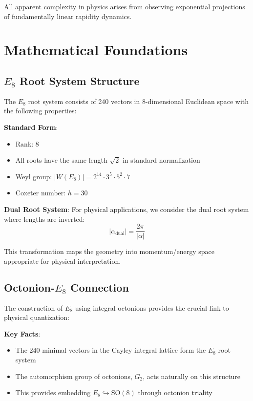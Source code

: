 \documentclass[12pt,a4paper]{article}
\begin{document}
All apparent complexity in physics arises from observing exponential projections of fundamentally linear rapidity dynamics.

\section{Mathematical Foundations}

\subsection{$E_{8}$ Root System Structure}

The $E_{8}$ root system consists of 240 vectors in 8-dimensional Euclidean space with the following properties:

\textbf{Standard Form}:
\begin{itemize}
\item Rank: 8
\item All roots have the same length $\sqrt{2}$ in standard normalization
\item Weyl group: $|W(E_8)| = 2^{14} \cdot 3^5 \cdot 5^2 \cdot 7$
\item Coxeter number: $h = 30$
\end{itemize}

\textbf{Dual Root System}: For physical applications, we consider the dual root system where lengths are inverted:
\begin{equation}
|\alpha_{\text{dual}}| = \frac{2\pi}{|\alpha|}
\end{equation}

This transformation maps the geometry into momentum/energy space appropriate for physical interpretation.

\subsection{Octonion-$E_{8}$ Connection}

The construction of $E_{8}$ using integral octonions provides the crucial link to physical quantization:

\textbf{Key Facts}:
\begin{itemize}
\item The 240 minimal vectors in the Cayley integral lattice form the $E_{8}$ root system
\item The automorphism group of octonions, $G_2$, acts naturally on this structure
\item This provides embedding $E_8 \hookrightarrow \text{SO}(8)$ through octonion triality
\end{itemize}
\end{document}
